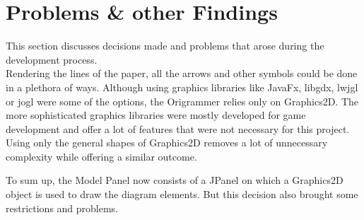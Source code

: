 
\section{Problems \& other Findings}
\label{sec:problems}

This section discusses decisions made and problems that arose during the development process.\\
Rendering the lines of the paper, all the arrows and other symbols could be done in a plethora of ways. Although using graphics libraries like JavaFx, libgdx, lwjgl or jogl were some of the options, the Origrammer relies only on Graphics2D. The more sophisticated graphics libraries were mostly developed for game development and offer a lot of features that were not necessary for this project. Using only the general shapes of Graphics2D removes a lot of unnecessary complexity while offering a similar outcome.

To sum up, the Model Panel now consists of a JPanel on which a Graphics2D object is used to draw the diagram elements. But this decision also brought some restrictions and problems.


